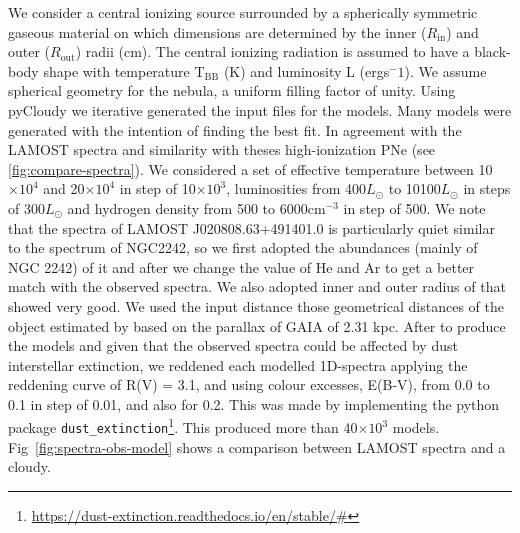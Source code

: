 \documentclass[fleqn,usenatbib]{mnras}
\begin{document}
We consider a central ionizing source surrounded by a spherically symmetric
gaseous material on which dimensions are determined by the inner ($R_{\mathrm{in}}$) and
outer ($R_{\mathrm{out}}$) radii (cm). The central ionizing radiation is assumed to have a
black-body shape with temperature T$_{\mathrm{BB}}$ (K) and luminosity L
(ergs$^-1$). We assume spherical geometry for the nebula, a uniform filling factor of unity.
Using {\sc pyCloudy} we iterative generated the input files for the models.
Many models were generated with the intention of finding the best fit.
In agreement with the LAMOST spectra and similarity with theses high-ionization PNe
(see \ref{fig:compare-spectra}).
We considered a set of effective temperature between 10$\times10^4$ and 20$\times10^4$
in step of 10$\times10^3$, luminosities from 400$L_{\odot}$ to 10100$L_{\odot}$ in steps
of 300$L_{\odot}$ and hydrogen density from 500 to  6000cm$^{-3}$ in step of 500.
We note that the spectra of LAMOST J020808.63+491401.0 is particularly quiet similar to the
spectrum of NGC2242, so we first adopted the abundances (mainly of NGC 2242) of it and after
we change the value of He and Ar to get a better match with the observed spectra.
We also adopted inner and outer radius of that showed very good. We used the input
distance those geometrical distances of the object estimated by \citet{Bailer:2021} based on
the parallax of GAIA of 2.31 kpc.
After to produce the models and given that the observed spectra could be affected by
dust interstellar extinction, we reddened each modelled 1D-spectra applying the
reddening curve of R(V) = 3.1, and using colour excesses, E(B-V), from 0.0 to 0.1 in
step of 0.01, and also for 0.2. This was made by implementing the python
package \texttt{dust\_extinction}\footnote{\url{https://dust-extinction.readthedocs.io/en/stable/#}}.
This produced more than 40$\times10^3$ models. Fig~\ref{fig:spectra-obs-model} shows a
comparison between LAMOST spectra and a {\sc cloudy}. %
\end{document}

